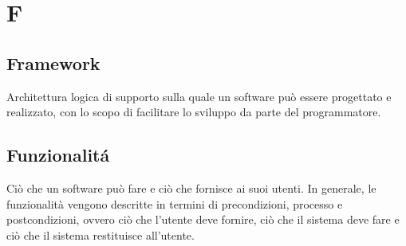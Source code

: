 \section{F}
\subsection{Framework}%
Architettura logica di supporto sulla quale un software può essere progettato e realizzato, 
con lo scopo di facilitare lo sviluppo da parte del programmatore.
\subsection{Funzionalitá}%
Ciò che un software può fare e ciò che fornisce ai suoi utenti.
In generale, le funzionalità vengono descritte in termini di precondizioni, processo e postcondizioni, ovvero ciò che l'utente deve fornire, 
ciò che il sistema deve fare e ciò che il sistema restituisce all'utente.
\clearpage